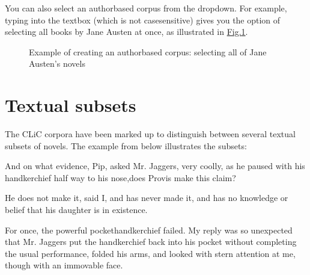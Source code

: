 \documentclass[letterpaper,10pt,english]{sphinxmanual}
\begin{document}
\sphinxAtStartPar
You can also select an author\sphinxhyphen{}based corpus from the drop\sphinxhyphen{}down. For
example, typing  into the textbox (which is not case\sphinxhyphen{}sensitive)
gives you the option of selecting all books by Jane Austen at once, as
illustrated in \hyperref[\detokenize{cliccorpora:figure-corpora-authorbased}]{Fig.\@ \ref{\detokenize{cliccorpora:figure-corpora-authorbased}}}.

\begin{figure}[htbp]
\centering
\capstart

\noindent{}
\caption{Example of creating an author\sphinxhyphen{}based corpus:
selecting all of Jane Austen’s novels}\label{\detokenize{cliccorpora:id6}}\label{\detokenize{cliccorpora:figure-corpora-authorbased}}\end{figure}


\section{Textual subsets}
\label{\detokenize{cliccorpora:textual-subsets}}
\sphinxAtStartPar
The CLiC corpora have been marked up to distinguish between several
textual subsets of novels. The example from  below
illustrates the subsets:

\begin{sphinxVerbatim}[commandchars=\\\{\}]
\PYGZdq{}And on what evidence, Pip,\PYGZdq{} asked Mr. Jaggers, very coolly, as he
paused with his handkerchief half way to his nose,\PYGZdq{}does Provis make
this claim?\PYGZdq{}

\PYGZdq{}He does not make it,\PYGZdq{} said I, \PYGZdq{}and has never made it, and has no
knowledge or belief that his daughter is in existence.\PYGZdq{}

For once, the powerful pocket\PYGZhy{}handkerchief failed. My reply was so
unexpected that Mr. Jaggers put the handkerchief back into his pocket
without completing the usual performance, folded his arms, and looked
with stern attention at me, though with an immovable face.
\end{sphinxVerbatim}
\end{document}
